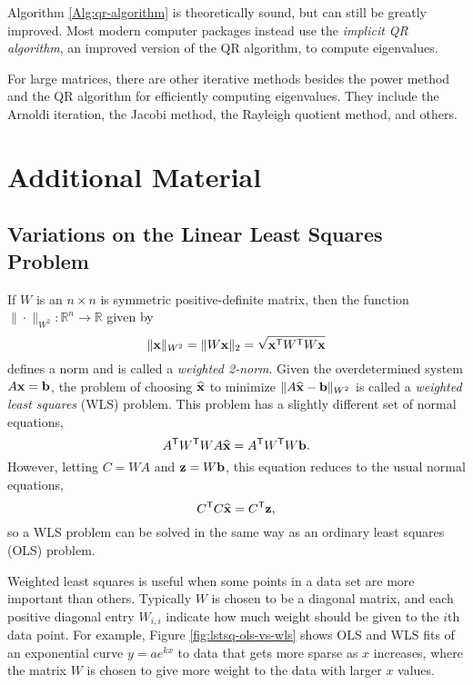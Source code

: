 \begin{info}
Algorithm \ref{Alg:qr-algorithm} is theoretically sound, but can still be greatly improved.
Most modern computer packages instead use the \emph{implicit QR algorithm}, an improved version of the QR algorithm, to compute eigenvalues.

For large matrices, there are other iterative methods besides the power method and the QR algorithm for efficiently computing eigenvalues.
They include the Arnoldi iteration, the Jacobi method, the Rayleigh quotient method, and others.
\end{info}

\newpage

\section*{Additional Material} %

\subsection*{Variations on the Linear Least Squares Problem} %

If $W$ is an $n\times n$ is symmetric positive-definite matrix, then the function $\|\cdot\|_{W^2}:\mathbb{R}^n\rightarrow\mathbb{R}$ given by
\[
\|\mathbf{x}\|_{W^2} = \|W\mathbf{x}\|_2 = \sqrt{\mathbf{x}^{\mathsf T} W^{\mathsf T} W\mathbf{x}}
\]
defines a norm and is called a \emph{weighted 2-norm}.
Given the overdetermined system $A\mathbf{x} = \mathbf{b}$, the problem of choosing $\widehat{\mathbf{x}}$ to minimize $\|A\widehat{\mathbf{x}} - \mathbf{b}\|_{W^2}$ is called a \emph{weighted least squares} (WLS) problem.
This problem has a slightly different set of normal equations,
\[
A^{\mathsf T} W^{\mathsf T} W A \widehat{\mathbf{x}} = A^{\mathsf T} W^{\mathsf T} W \mathbf{b}.
\]
However, letting $C = W A$ and $\mathbf{z} = W \mathbf{b}$, this equation reduces to the usual normal equations,
\[
C^{\mathsf T} C \widehat{\mathbf{x}} = C^{\mathsf T} \mathbf{z},
\]
so a WLS problem can be solved in the same way as an ordinary least squares (OLS) problem.

Weighted least squares is useful when some points in a data set are more important than others.
Typically $W$ is chosen to be a diagonal matrix, and each positive diagonal entry $W_{i,i}$ indicate how much weight should be given to the $i$th data point.
For example, Figure \ref{fig:lstsq-ols-vs-wls} shows OLS and WLS fits of an exponential curve $y = ae^{kx}$ to data that gets more sparse as $x$ increases, where the matrix $W$ is chosen to give more weight to the data with larger $x$ values.

